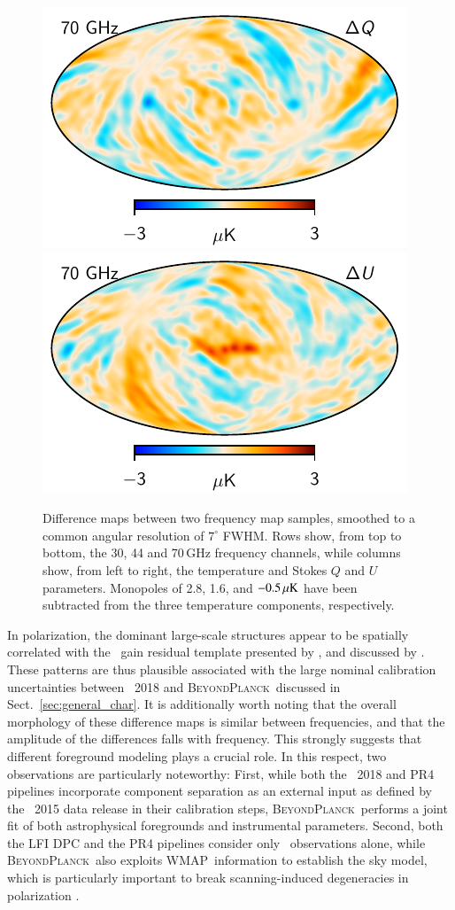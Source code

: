 \documentclass[twocolumn]{aa}
\def\WMAP{WMAP}
\newcommand{\BP}{\textsc{BeyondPlanck}}
\begin{document}
\begin{figure}
  \includegraphics[width=0.33\linewidth]{figs/bp_070_sampdiff_full_Q_BP10.pdf}
  \includegraphics[width=0.33\linewidth]{figs/bp_070_sampdiff_full_U_BP10.pdf}
  \caption{Difference maps between two frequency map samples, smoothed
    to a common angular resolution of $7^{\circ}$ FWHM. Rows show,
    from top to bottom, the 30, 44 and 70\,GHz frequency channels,
    while columns show, from left to right, the temperature and Stokes
    $Q$ and $U$ parameters. Monopoles of 2.8, 1.6, and $-0.5\muK$ have
    been subtracted from the three temperature components,
    respectively. }
  \label{fig:freq_sampdiff}  
\end{figure}

In polarization, the dominant large-scale structures appear to be
spatially correlated with the \Planck\ gain residual template
presented by \citet{planck2016-l02}, and discussed by \citet{bp07}.
These patterns are thus plausible associated with the large nominal
calibration uncertainties between \Planck\ 2018 and \BP\ discussed in
Sect.~\ref{sec:general_char}. It is additionally worth noting that the
overall morphology of these difference maps is similar between
frequencies, and that the amplitude of the differences falls with
frequency. This strongly suggests that different foreground modeling
plays a crucial role. In this respect, two observations are
particularly noteworthy: First, while both the \Planck\ 2018 and PR4
pipelines incorporate component separation as an external input as
defined by the \Planck\ 2015 data release \citep{planck2014-a12} in
their calibration steps, \BP\ performs a joint fit of both
astrophysical foregrounds and instrumental parameters. Second, both
the LFI DPC and the PR4 pipelines consider only \Planck\ observations
alone, while \BP\ also exploits \WMAP\ information to establish the
sky model, which is particularly important to break scanning-induced
degeneracies in polarization \citep{bp07}.
\end{document}
